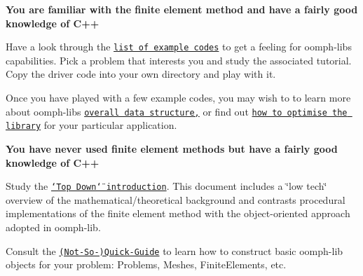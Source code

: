 \begin{DoxyItemize}
\item {\bfseries You are familiar with the finite element method and have a fairly good knowledge of C++}~\newline
~\newline

\begin{DoxyItemize}
\item Have a look through the \href{../../example_code_list/html/index.html}{\tt list of example codes} to get a feeling for {\ttfamily oomph-\/lib\textquotesingle{}s} capabilities. Pick a problem that interests you and study the associated tutorial. Copy the driver code into your own directory and play with it. ~\newline
~\newline

\item Once you have played with a few example codes, you may wish to to learn more about {\ttfamily oomph-\/lib\textquotesingle{}s} \href{../../the_data_structure/html/index.html}{\tt overall data structure,} or find out \href{../../optimisation/html/index.html}{\tt how to optimise the library} for your particular application. ~\newline
~\newline

\end{DoxyItemize}
\item {\bfseries You have never used finite element methods but have a fairly good knowledge of C++}~\newline
~\newline

\begin{DoxyItemize}
\item Study the \href{../../intro/html/index.html}{\tt \char`\"{}\+Top Down\char`\"{} introduction}. This document includes a \char`\"{}low tech\char`\"{} overview of the mathematical/theoretical background and contrasts procedural implementations of the finite element method with the object-\/oriented approach adopted in {\ttfamily oomph-\/lib}. ~\newline
~\newline

\item Consult the \href{../../quick_guide/html/index.html}{\tt (Not-\/\+So-\/)Quick-\/\+Guide} to learn how to construct basic {\ttfamily oomph-\/lib} objects for your problem\+: {\ttfamily Problems}, {\ttfamily Meshes}, {\ttfamily Finite\+Elements}, etc. ~\newline
~\newline


\end{DoxyItemize}
\end{DoxyItemize}
